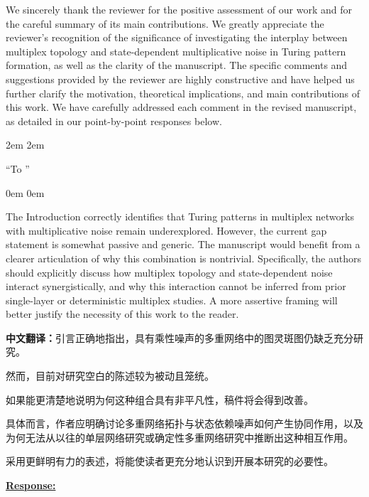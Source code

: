\documentclass[a4paper,12pt]{article}
\newcommand{\zhtranslationfirst}[1]{%
    \par\medskip\noindent
    {\small\color{blue!60!black}\textbf{中文翻译：}#1}\par
}
\newcommand{\zhtranslation}[1]{%
    \par\smallskip\noindent
    {\small\color{blue!60!black}#1}\par
}
\begin{document}
We sincerely thank the reviewer for the positive assessment of our work and for the careful summary of its main contributions. We greatly appreciate the reviewer’s recognition of the significance of investigating the interplay between multiplex topology and state-dependent multiplicative noise in Turing pattern formation, as well as the clarity of the manuscript. The specific comments and suggestions provided by the reviewer are highly constructive and have helped us further clarify the motivation, theoretical implications, and main contributions of this work. We have carefully addressed each comment in the revised manuscript, as detailed in our point-by-point responses below.

\leftskip 2em
\rightskip 2em
\medskip

``To ''

\leftskip 0em
\rightskip 0em
\medskip

\newpage
\begin{tcolorbox}[title = {Comment 1},fonttitle = \bfseries]
    The Introduction correctly identifies that Turing patterns in multiplex networks with multiplicative noise remain underexplored. However, the current gap statement is somewhat passive and generic. The manuscript would benefit from a clearer articulation of why this combination is nontrivial. Specifically, the authors should explicitly discuss how multiplex topology and state-dependent noise interact synergistically, and why this interaction cannot be inferred from prior single-layer or deterministic multiplex studies. A more assertive framing will better justify the necessity of this work to the reader.
    \zhtranslationfirst{引言正确地指出，具有乘性噪声的多重网络中的图灵斑图仍缺乏充分研究。}
    \zhtranslation{然而，目前对研究空白的陈述较为被动且笼统。}
    \zhtranslation{如果能更清楚地说明为何这种组合具有非平凡性，稿件将会得到改善。}
    \zhtranslation{具体而言，作者应明确讨论多重网络拓扑与状态依赖噪声如何产生协同作用，以及为何无法从以往的单层网络研究或确定性多重网络研究中推断出这种相互作用。}
    \zhtranslation{采用更鲜明有力的表述，将能使读者更充分地认识到开展本研究的必要性。}
\end{tcolorbox}

\noindent \underline {\textbf{Response:}}
\bigskip
\end{document}
